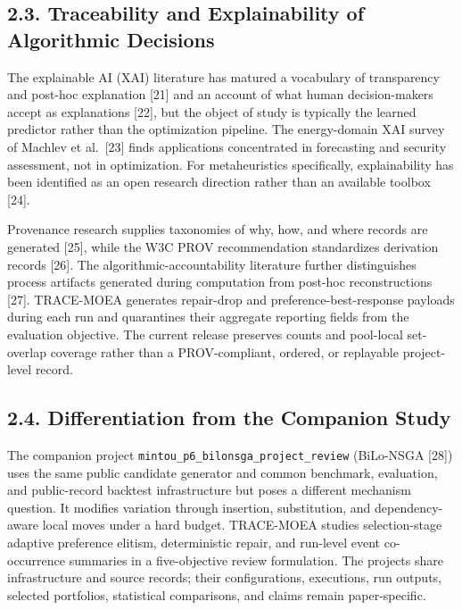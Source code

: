 \documentclass[
  10pt,
  a4paper,
]{article}
\begin{document}
\subsection{2.3. Traceability and Explainability of Algorithmic
Decisions}\label{traceability-and-explainability-of-algorithmic-decisions}

The explainable AI (XAI) literature has matured a vocabulary of
transparency and post-hoc explanation {[}21{]} and an account of what
human decision-makers accept as explanations {[}22{]}, but the object of
study is typically the learned predictor rather than the optimization
pipeline. The energy-domain XAI survey of Machlev et al.~{[}23{]} finds
applications concentrated in forecasting and security assessment, not in
optimization. For metaheuristics specifically, explainability has been
identified as an open research direction rather than an available
toolbox {[}24{]}.

Provenance research supplies taxonomies of why, how, and where records
are generated {[}25{]}, while the W3C PROV recommendation standardizes
derivation records {[}26{]}. The algorithmic-accountability literature
further distinguishes process artifacts generated during computation
from post-hoc reconstructions {[}27{]}. TRACE-MOEA generates repair-drop
and preference-best-response payloads during each run and quarantines
their aggregate reporting fields from the evaluation objective. The
current release preserves counts and pool-local set-overlap coverage
rather than a PROV-compliant, ordered, or replayable project-level
record.

\subsection{2.4. Differentiation from the Companion
Study}\label{differentiation-from-the-companion-study}

The companion project \texttt{mintou\_p6\_bilonsga\_project\_review}
(BiLo-NSGA {[}28{]}) uses the same public candidate generator and common
benchmark, evaluation, and public-record backtest infrastructure but
poses a different mechanism question. It modifies variation through
insertion, substitution, and dependency-aware local moves under a hard
budget. TRACE-MOEA studies selection-stage adaptive preference elitism,
deterministic repair, and run-level event co-occurrence summaries in a
five-objective review formulation. The projects share infrastructure and
source records; their configurations, executions, run outputs, selected
portfolios, statistical comparisons, and claims remain paper-specific.
\end{document}
